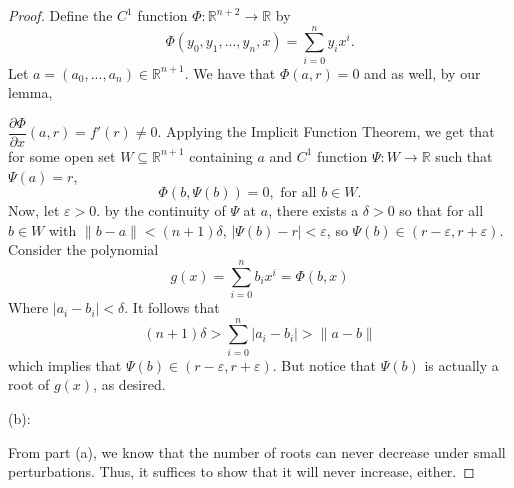 \documentclass{article}
\theoremstyle{plain} %
\numberwithin{thm}{section} %
\theoremstyle{definition}
\begin{document}
\begin{proof}
    Define the \(C^1\) function \(\Phi : \mathbb{R}^{n+2} \to \mathbb{R}\) by
    \[
        \Phi (y_0, y_1, ..., y_{n}, x) = \sum_{i=0}^{n} y_i x^i.
    \]
    Let \(a = (a_0, ..., a_n) \in \mathbb{R}^{n+1}\). We have that \(\Phi (a, r) = 0\) and as well, by our lemma,
    
    \(\dfrac{\partial \Phi}{\partial x}(a, r) = f'(r) \neq 0\). Applying the Implicit Function Theorem, we get that for some open set \(W \subseteq \mathbb{R}^{n+1}\) containing \(a\) and \(C^1\) function \(\Psi : W \to \mathbb{R}\) such that \(\Psi (a) = r\),
    \[
        \Phi (b, \Psi (b)) = 0, \text{ for all } b \in W.
    \]
    Now, let \(\varepsilon > 0\). by the continuity of \(\Psi\) at \(a\), there exists a \(\delta > 0\) so that for all \(b \in W\) with \(\|b - a\| < (n+1)\delta\), \(|\Psi (b) - r| < \varepsilon\), so \(\Psi (b) \in (r - \varepsilon, r + \varepsilon)\). Consider the polynomial
    \[
        g(x) = \sum_{i=0}^{n} b_i x^i = \Phi (b,x)
    \]
    Where \(|a_i - b_i| < \delta\). It follows that
    \[
        (n+1)\delta > \sum_{i=0}^{n} |a_i - b_i| > \|a - b\|
    \]
    which implies that \(\Psi (b) \in (r - \varepsilon, r + \varepsilon)\). But notice that \(\Psi (b)\) is actually a root of \(g(x)\), as desired.

    \medskip

    (b):

    From part (a), we know that the number of roots can never decrease under small perturbations. Thus, it suffices to show that it will never increase, either.


\end{proof}
\end{document}
